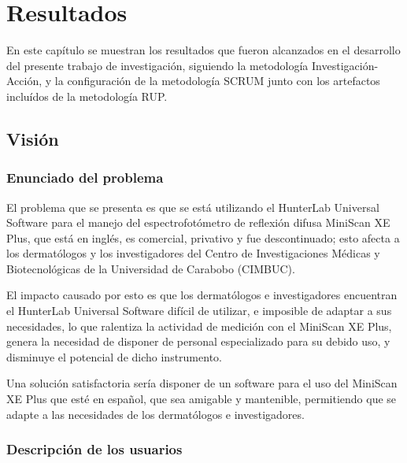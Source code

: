 \chapter{Resultados}

En este cap\'{i}tulo se muestran los resultados que fueron alcanzados en el desarrollo del presente trabajo de investigaci\'{o}n, siguiendo la metodolog\'{i}a Investigaci\'{o}n-Acci\'{o}n, y la configuraci\'{o}n de la metodolog\'{i}a SCRUM junto con los artefactos inclu\'{i}dos de la metodolog\'{i}a RUP.

\section{Visi\'{o}n}
	
	\subsection{Enunciado del problema}
	
	El problema que se presenta es que se est\'{a} utilizando el HunterLab Universal Software para el manejo del espectrofot\'{o}metro de reflexi\'{o}n difusa MiniScan XE Plus, que est\'{a} en ingl\'{e}s, es comercial, privativo y fue descontinuado; esto afecta a los dermat\'{o}logos y los investigadores del Centro de Investigaciones M\'{e}dicas y Biotecnol\'{o}gicas de la Universidad de Carabobo (CIMBUC).
	
	El impacto causado por esto es que los dermat\'{o}logos e investigadores encuentran el HunterLab Universal Software dif\'{i}cil de utilizar, e imposible de adaptar a sus necesidades, lo que ralentiza la actividad de medici\'{o}n con el MiniScan XE Plus, genera la necesidad de disponer de personal especializado para su debido uso, y disminuye el potencial de dicho instrumento.
	
	Una soluci\'{o}n satisfactoria ser\'{i}a disponer de un software para el uso del \mbox{MiniScan} XE Plus que est\'{e} en espa\~{n}ol, que sea amigable y mantenible, permitiendo que se adapte a las necesidades de los dermat\'{o}logos e investigadores.
	
	\subsection{Descripci\'{o}n de los usuarios}
	
